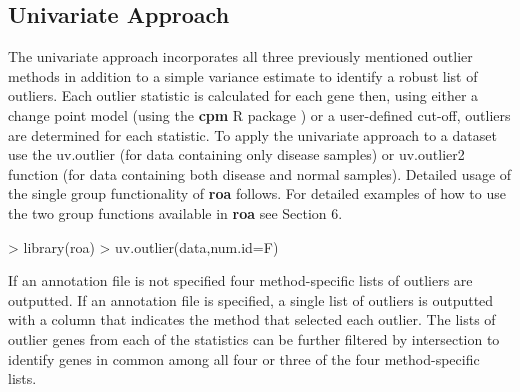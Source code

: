 \documentclass[11pt, a4paper]{article}
\begin{document}
\subsection{Univariate Approach}
The univariate approach incorporates all three previously mentioned outlier methods in addition to a simple variance estimate to identify a robust list of outliers. Each outlier statistic is calculated for each gene then, using either a change point model (using the \textbf{cpm} R package \cite{cpm}) or a user-defined cut-off, outliers are determined for each statistic. To apply the univariate approach to a dataset use the uv.outlier (for data containing only disease samples) or uv.outlier2 function (for data containing both disease and normal samples). Detailed usage of the single group functionality of \textbf{roa} follows. For detailed examples of how to use the two group functions available in \textbf{roa} see Section 6.
\begin{Schunk}
\begin{Sinput}
> library(roa)
> uv.outlier(data,num.id=F)
\end{Sinput}
\end{Schunk}
If an annotation file is not specified four method-specific lists of outliers are outputted. If an annotation file is specified, a single list of outliers is outputted with a column that indicates the method that selected each outlier. The lists of outlier genes from each of the statistics can be further filtered by intersection to identify genes in common among all four or three of the four method-specific lists.
\end{document}
